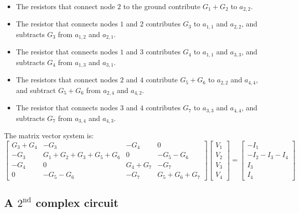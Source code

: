 \documentclass{article}
\begin{document}
\begin{itemize}
\item The resistors that connect node \(2\) to the ground contribute \(G_1 + G_2\) to \(a_{2,2}\). 
\item The resistor that connects nodes \(1\) and \(2\) contributes \(G_3\) to \(a_{1,1}\) and \(a_{2,2}\), and subtracts \(G_3\) from \(a_{1,2}\) and \(a_{2,1}\). 
\item The resistor that connects nodes \(1\) and \(3\) contributes \(G_4\) to \(a_{1,1}\) and \(a_{3,3}\), and subtracts \(G_4\) from \(a_{1,3}\) and \(a_{3,1}\). 
\item The resistors that connect nodes \(2\) and \(4\) contribute \(G_5 + G_6\) to \(a_{2,2}\) and \(a_{4,4}\), and subtract \(G_5 + G_6\) from \(a_{2,4}\) and \(a_{4,2}\). 
\item The resistor that connects nodes \(3\) and \(4\) contributes \(G_7\) to \(a_{3,3}\) and \(a_{4,4}\), and subtracts \(G_7\) from \(a_{3,4}\) and \(a_{4,3}\). 
\end{itemize}

The matrix vector system is:
\[\begin{bmatrix} 
G_3 + G_4 & -G_3 & -G_4 & 0 \\ 
-G_3 & G_1 + G_2 + G_3 + G_5 + G_6 & 0 & -G_5 - G_6 \\ 
-G_4 & 0 & G_4 + G_7 & -G_7 \\ 
0 & -G_5 - G_6 & -G_7 & G_5 + G_6 + G_7  
\end{bmatrix}
\begin{bmatrix} V_1 \\ V_2 \\ V_3 \\ V_4 \end{bmatrix} = 
\begin{bmatrix} -I_1 \\ -I_2 - I_3 - I_4 \\ I_3 \\ I_4 \end{bmatrix}\]




\subsection{A $2^{\text{nd}}$ complex circuit}
\end{document}
